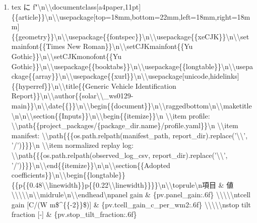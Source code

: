 \documentclass[a4paper,11pt]{article}
\begin{document}
\begin{enumerate}[leftmargin=1.8em]
\item tex に f"\textbackslash{}n\textbackslash{}\textbackslash{}documentclass[a4paper,11pt]\{\{article\}\}\textbackslash{}n\textbackslash{}\textbackslash{}usepackage[top=18mm,bottom=22mm,left=18mm,right=18mm]\{\{geometry\}\}\textbackslash{}n\textbackslash{}\textbackslash{}usepackage\{\{fontspec\}\}\textbackslash{}n\textbackslash{}\textbackslash{}usepackage\{\{xeCJK\}\}\textbackslash{}n\textbackslash{}\textbackslash{}setmainfont\{\{Times New Roman\}\}\textbackslash{}n\textbackslash{}\textbackslash{}setCJKmainfont\{\{Yu Gothic\}\}\textbackslash{}n\textbackslash{}\textbackslash{}setCJKmonofont\{\{Yu Gothic\}\}\textbackslash{}n\textbackslash{}\textbackslash{}usepackage\{\{booktabs\}\}\textbackslash{}n\textbackslash{}\textbackslash{}usepackage\{\{longtable\}\}\textbackslash{}n\textbackslash{}\textbackslash{}usepackage\{\{array\}\}\textbackslash{}n\textbackslash{}\textbackslash{}usepackage\{\{xurl\}\}\textbackslash{}n\textbackslash{}\textbackslash{}usepackage[unicode,hidelinks]\{\{hyperref\}\}\textbackslash{}n\textbackslash{}\textbackslash{}title\{\{Generic Vehicle Identification Report\}\}\textbackslash{}n\textbackslash{}\textbackslash{}author\{\{solar\textbackslash{}\textbackslash{}\_ws0129-main\}\}\textbackslash{}n\textbackslash{}\textbackslash{}date\{\{\}\}\textbackslash{}n\textbackslash{}\textbackslash{}begin\{\{document\}\}\textbackslash{}n\textbackslash{}\textbackslash{}raggedbottom\textbackslash{}n\textbackslash{}\textbackslash{}maketitle\textbackslash{}n\textbackslash{}n\textbackslash{}\textbackslash{}section\{\{Inputs\}\}\textbackslash{}n\textbackslash{}\textbackslash{}begin\{\{itemize\}\}\textbackslash{}n  \textbackslash{}\textbackslash{}item profile: \textbackslash{}\textbackslash{}path\{\{project\_packages/\{package\_dir.name\}/profile.yaml\}\}\textbackslash{}n  \textbackslash{}\textbackslash{}item manifest: \textbackslash{}\textbackslash{}path\{\{\{os.path.relpath(manifest\_path, report\_dir).replace('\textbackslash{}\textbackslash{}', '/')\}\}\}\textbackslash{}n  \textbackslash{}\textbackslash{}item normalized replay log: \textbackslash{}\textbackslash{}path\{\{\{os.path.relpath(observed\_log\_csv, report\_dir).replace('\textbackslash{}\textbackslash{}', '/')\}\}\}\textbackslash{}n\textbackslash{}\textbackslash{}end\{\{itemize\}\}\textbackslash{}n\textbackslash{}n\textbackslash{}\textbackslash{}section\{\{Adopted coefficients\}\}\textbackslash{}n\textbackslash{}\textbackslash{}begin\{\{longtable\}\}\{\{p\{\{0.48\textbackslash{}\textbackslash{}linewidth\}\}p\{\{0.22\textbackslash{}\textbackslash{}linewidth\}\}\}\}\textbackslash{}n\textbackslash{}\textbackslash{}toprule\textbackslash{}n項目 \& 値 \textbackslash{}\textbackslash{}\textbackslash{}\textbackslash{}\textbackslash{}n\textbackslash{}\textbackslash{}midrule\textbackslash{}n\textbackslash{}\textbackslash{}endhead\textbackslash{}npanel gain \& \{pv.panel\_gain:.6f\} \textbackslash{}\textbackslash{}\textbackslash{}\textbackslash{}\textbackslash{}ntcell gain [C/(W m\$\textasciicircum{}\{\{-2\}\}\$)] \& \{pv.tcell\_gain\_c\_per\_wm2:.6f\} \textbackslash{}\textbackslash{}\textbackslash{}\textbackslash{}\textbackslash{}nstop tilt fraction [-] \& \{pv.stop\_tilt\_fraction:.6f\} 
\end{enumerate}
\end{document}
